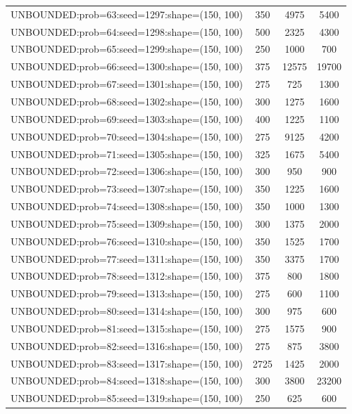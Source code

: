 \begin{longtable}{lccc}
UNBOUNDED:prob=63:seed=1297:shape=(150, 100)  &      350 &  4975 &   5400 \\
UNBOUNDED:prob=64:seed=1298:shape=(150, 100)  &      500 &  2325 &   4300 \\
UNBOUNDED:prob=65:seed=1299:shape=(150, 100)  &      250 &  1000 &    700 \\
UNBOUNDED:prob=66:seed=1300:shape=(150, 100)  &      375 & 12575 &  19700 \\
UNBOUNDED:prob=67:seed=1301:shape=(150, 100)  &      275 &   725 &   1300 \\
UNBOUNDED:prob=68:seed=1302:shape=(150, 100)  &      300 &  1275 &   1600 \\
UNBOUNDED:prob=69:seed=1303:shape=(150, 100)  &      400 &  1225 &   1100 \\
UNBOUNDED:prob=70:seed=1304:shape=(150, 100)  &      275 &  9125 &   4200 \\
UNBOUNDED:prob=71:seed=1305:shape=(150, 100)  &      325 &  1675 &   5400 \\
UNBOUNDED:prob=72:seed=1306:shape=(150, 100)  &      300 &   950 &    900 \\
UNBOUNDED:prob=73:seed=1307:shape=(150, 100)  &      350 &  1225 &   1600 \\
UNBOUNDED:prob=74:seed=1308:shape=(150, 100)  &      350 &  1000 &   1300 \\
UNBOUNDED:prob=75:seed=1309:shape=(150, 100)  &      300 &  1375 &   2000 \\
UNBOUNDED:prob=76:seed=1310:shape=(150, 100)  &      350 &  1525 &   1700 \\
UNBOUNDED:prob=77:seed=1311:shape=(150, 100)  &      350 &  3375 &   1700 \\
UNBOUNDED:prob=78:seed=1312:shape=(150, 100)  &      375 &   800 &   1800 \\
UNBOUNDED:prob=79:seed=1313:shape=(150, 100)  &      275 &   600 &   1100 \\
UNBOUNDED:prob=80:seed=1314:shape=(150, 100)  &      300 &   975 &    600 \\
UNBOUNDED:prob=81:seed=1315:shape=(150, 100)  &      275 &  1575 &    900 \\
UNBOUNDED:prob=82:seed=1316:shape=(150, 100)  &      275 &   875 &   3800 \\
UNBOUNDED:prob=83:seed=1317:shape=(150, 100)  &     2725 &  1425 &   2000 \\
UNBOUNDED:prob=84:seed=1318:shape=(150, 100)  &      300 &  3800 &  23200 \\
UNBOUNDED:prob=85:seed=1319:shape=(150, 100)  &      250 &   625 &    600 \\

\end{longtable}
